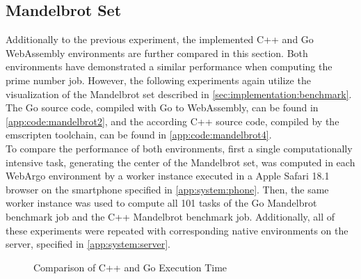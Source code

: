 \subsection{Mandelbrot Set}
Additionally to the previous experiment, the implemented C++ and Go WebAssembly environments are further compared in this section. Both environments have demonstrated a similar performance when computing the prime number job. However, the following experiments again utilize the visualization of the Mandelbrot set described in \autoref{sec:implementation:benchmark}. The Go source code, compiled with Go \cite{methodology:go} to WebAssembly, can be found in \autoref{app:code:mandelbrot2}, and the according C++ source code, compiled by the emscripten \cite{methodology:emcc} toolchain, can be found in \autoref{app:code:mandelbrot4}.
~\\
To compare the performance of both environments, first a single computationally intensive task, generating the center of the Mandelbrot set, was computed in each WebArgo environment by a worker instance executed in a Apple Safari 18.1 \cite{evaluation:safari} browser on the smartphone specified in \autoref{app:system:phone}. Then, the same worker instance was used to compute all 101 tasks of the Go Mandelbrot benchmark job and the C++ Mandelbrot benchmark job. Additionally, all of these experiments were repeated with corresponding native environments on the server, specified in \autoref{app:system:server}.
\begin{figure}[htbp]
    \myfloatalign
    \caption{Comparison of C++ and Go Execution Time}
    \label{fig:evaluation:experiment-E}
\end{figure}
